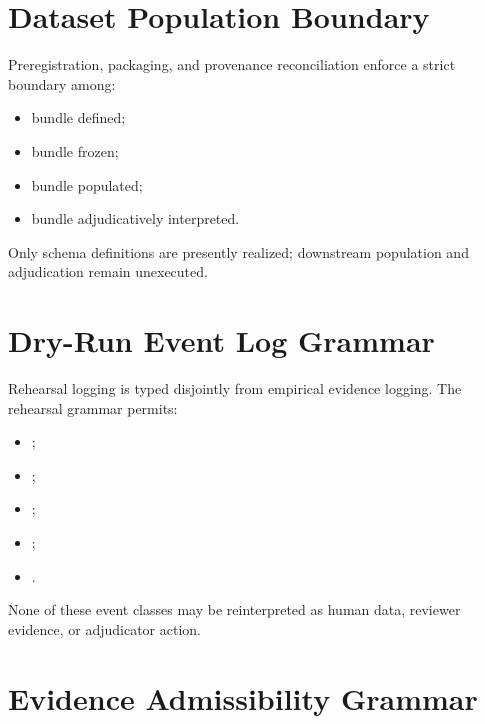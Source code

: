 \documentclass[11pt,a4paper]{article}
\begin{document}
\section{Dataset Population Boundary}

Preregistration, packaging, and provenance reconciliation enforce a strict boundary among:

\begin{itemize}
\item bundle defined;
\item bundle frozen;
\item bundle populated;
\item bundle adjudicatively interpreted.
\end{itemize}

Only schema definitions are presently realized; downstream population and adjudication remain unexecuted.

\section{Dry-Run Event Log Grammar}

Rehearsal logging is typed disjointly from empirical evidence logging. The rehearsal grammar permits:

\begin{itemize}
\item \texttt{\allowbreak{}\allowbreak{}\allowbreak{}};
\item \texttt{\allowbreak{}\allowbreak{}};
\item \texttt{\allowbreak{}\allowbreak{}};
\item \texttt{\allowbreak{}\allowbreak{}};
\item \texttt{\allowbreak{}\allowbreak{}\allowbreak{}}.
\end{itemize}

None of these event classes may be reinterpreted as human data, reviewer
evidence, or adjudicator action.

\section{Evidence Admissibility Grammar}
\end{document}
